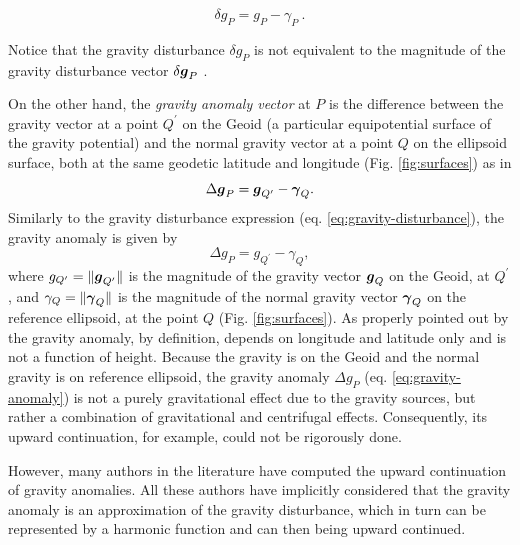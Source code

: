 \documentclass[extra]{gji}
\begin{document}
\begin{equation}
\delta g_{P} = g_{P} - \gamma_{P} \: .
\label{eq:gravity-disturbance}
\end{equation}

Notice that the gravity disturbance $\delta g_{P}$ is not equivalent
to the magnitude of the gravity disturbance vector
$\delta \mitbf{g}_{P}$ \citep{barthelmes2013, sanso_sideris2013}.

On the other hand, the \textit{gravity anomaly vector} at $P$
is the difference between the gravity
vector at a point $Q^{\prime}$ on the Geoid (a particular
equipotential surface of the gravity potential) and the normal
gravity vector at a point $Q$ on the ellipsoid surface, both at the
same geodetic latitude and longitude (Fig. \ref{fig:surfaces}) as in
\begin{equation}
\Delta \mitbf{g}_{P} = \mitbf{g}_{Q^{\prime}} - \mitbf{\gamma}_{Q} .
\label{eq:gravity-anomaly-vector}
\end{equation}
Similarly to the gravity disturbance expression (eq.
\ref{eq:gravity-disturbance}), the gravity anomaly is given by
\begin{equation}
\Delta g_{P} = g_{Q^{\prime}} - \gamma_{Q} ,
\label{eq:gravity-anomaly}
\end{equation}
where $g_{Q^{\prime} } = \| \mitbf{g}_{Q^{\prime}} \|$ is
the magnitude of the gravity vector $\mitbf{g}_{Q}$ on the Geoid,
at $Q^{\prime}$, and $\gamma_{Q} = \| \mitbf{\gamma}_{Q} \|$ is the
magnitude of the normal gravity vector $\mitbf{\gamma}_{Q}$
on the reference ellipsoid, at the point $Q$ (Fig. \ref{fig:surfaces}).
As properly pointed out by \citet{barthelmes2013} the gravity anomaly,
by definition, depends on
longitude and latitude only and is not a function of height.
Because the gravity is on the Geoid and the normal gravity
is on reference ellipsoid, the gravity anomaly $\Delta g_{P}$
(eq. \ref{eq:gravity-anomaly}) is not a purely gravitational effect
due to the gravity sources, but rather a combination of gravitational
and centrifugal effects. Consequently, its upward continuation,
for example, could not be rigorously done.

However, many authors in the literature have computed the upward
continuation of gravity anomalies. All these authors have
implicitly considered that the gravity anomaly is an approximation of
the gravity disturbance, which in turn can be represented by a
harmonic function and can then being upward continued.
\end{document}
